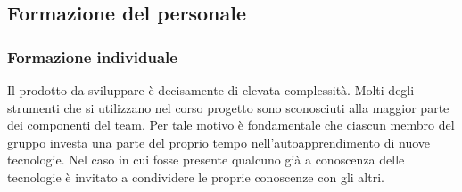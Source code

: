 \documentclass[../norme-di-progetto.tex]{subfiles}
\begin{document}
\subsection{Formazione del personale}
\label{sub:formazione del personale}
\subsubsection{Formazione individuale}
\label{subs:formazione individuale}
Il prodotto da sviluppare è decisamente di elevata complessità. Molti degli strumenti che si utilizzano nel corso  progetto sono sconosciuti alla maggior parte dei componenti del team. Per tale motivo è fondamentale che ciascun membro del gruppo investa una parte del proprio tempo nell'autoapprendimento di nuove tecnologie. Nel caso in cui fosse presente qualcuno già a conoscenza delle tecnologie è invitato a condividere le proprie conoscenze con gli altri.
\end{document}
